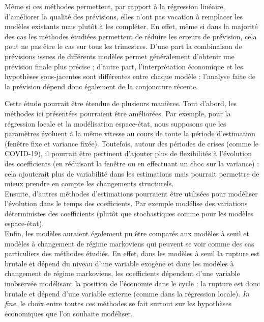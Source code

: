 \documentclass[
  a4paper,
  DIV=11,
  numbers=noendperiod,
  french]{scrartcl}
\newcommand\1{{\mathds 1}}
\theoremstyle{remark}
\begin{document}
Même si ces méthodes permettent, par rapport à la régression linéaire,
d'améliorer la qualité des prévisions, elles n'ont pas vocation à
remplacer les modèles existants mais plutôt à les compléter. En effet,
même si dans la majorité des cas les méthodes étudiées permettent de
réduire les erreurs de prévision, cela peut ne pas être le cas sur tous
les trimestres. D'une part la combinaison de prévisions issues de
différents modèles permet généralement d'obtenir une prévision finale
plus précise \autocite[voir par exemple][ pour une revue de
littérature]{WANG20231518} ; d'autre part, l'interprétation économique
et les hypothèses sous-jacentes sont différentes entre chaque modèle :
l'analyse faite de la prévision dépend donc également de la conjoncture
récente.

Cette étude pourrait être étendue de plusieurs manières. Tout d'abord,
les méthodes ici présentées pourraient être améliorées. Par exemple,
pour la régression locale et la modélisation espace-état, nous supposons
que les paramètres évoluent à la même vitesse au cours de toute la
période d'estimation (fenêtre fixe et variance fixée). Toutefois, autour
des périodes de crises (comme le COVID-19), il pourrait être pertinent
d'ajouter plus de flexibilités à l'évolution des coefficients (en
réduisant la fenêtre ou en effectuant un choc sur la variance) : cela
ajouterait plus de variabilité dans les estimations mais pourrait
permettre de mieux prendre en compte les changements structurels.\\
Ensuite, d'autres méthodes d'estimations pourraient être utilisées pour
modéliser l'évolution dans le temps des coefficients. Par exemple
\textcite{melard} modélise des variations déterministes des coefficients
(plutôt que stochastiques comme pour les modèles espace-état).\\
Enfin, les modèles auraient également pu être comparés aux modèles à
seuil et modèles à changement de régime markoviens \autocite[pour une
revue bibliographique de ces modèles, voir par
exemple][]{PETROPOULOS2022705} qui peuvent se voir comme des cas
particuliers des méthodes étudiés. En effet, dans les modèles à seuil la
rupture est brutale et dépend du niveau d'une variable exogène et dans
les modèles à changement de régime markoviens, les coefficients
dépendent d'une variable inobservée modélisant la position de l'économie
dans le cycle : la rupture est donc brutale et dépend d'une variable
externe (comme dans la régression locale). \emph{In fine}, le choix
entre toutes ces méthodes se fait surtout sur les hypothèses économiques
que l'on souhaite modéliser.
\end{document}
